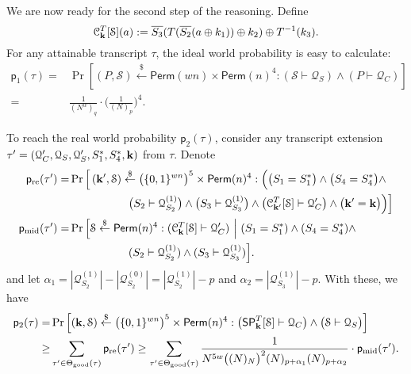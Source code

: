 \documentclass[journal=tosc,final,nohyperref]{iacrtrans}
\begin{document}
We are now ready for the second step of the reasoning. Define
%
$$\mathcal{C}_{\mathbf{k}}^T[\mathcal{S}](a):=   \overline{S_3}(T(\overline{S_2}(a\oplus k_1))\oplus k_2)\oplus T^{-1}(k_3).$$
%
For any attainable transcript $\tau$, the ideal world probability is easy to calculate:
%
%
\begin{align*}
\mathsf{p}_{1}(\tau)=&\operatorname{Pr}\left[(P,\mathcal{S})\stackrel{\$}{\leftarrow} {\mathsf{Perm}}(wn)\times\mathsf{Perm}(n)^4: (\mathcal{S} \vdash \mathcal{Q}_{S}) \wedge(P \vdash \mathcal{Q}_{C})  \right]		\\
=&\frac{1}{(N^w)_q}\cdot\bigg(\frac{1}{(N)_p}\bigg)^4.
\end{align*}



To reach the real world probability $\mathsf{p}_2(\tau)$, consider any transcript extension $\tau'=(\mathcal{Q}_{C}',\mathcal{Q}_{S},\mathcal{Q}_{S}',S_1^*,S_4^*,\mathbf{k})$ from $\tau$. Denote
%
%
\begin{align}
\mathsf{p}_{\mathrm{re}}(\tau') = & \operatorname{Pr}\Big[\left(\mathbf{k}',\mathcal{S}\right) \stackrel{\$}{\leftarrow} \big(\{0,1\}^{wn}\big)^5 \times \mathsf{Perm}(n)^4:
\Big(\big(S_1=S_1^*\big)\wedge\big(S_4=S_4^*\big)\wedge		\notag 	\\
&\ \ \ \ \ \ \ \ \ \ \ \ \ \ \ \ \big(S_2\vdash\mathcal{Q}_{S_2}^{(1)}\big)\wedge\big(S_3\vdash\mathcal{Q}_{S_3}^{(1)}\big)\wedge\big(\mathcal{C}_{\mathbf{k}'}^T[\mathcal{S}] \vdash \mathcal{Q}_C'\big)\wedge\big(\mathbf{k}'=\mathbf{k}\big)\Big)\Big]	 	\notag 	\\
\mathsf{p}_{\mathrm{mid}}(\tau') = & \operatorname{Pr}\Big[\mathcal{S} \stackrel{\$}{\leftarrow}\mathsf{Perm}(n)^4:(\mathcal{C}_{\mathbf{k}}^T[\mathcal{S}] \vdash \mathcal{Q}_C')~\Big|~
(S_1=S_1^*)\wedge (S_4=S_4^*)\wedge	 	\notag 	\\
&\ \ \ \ \ \ \ \ \ \ \ \ \ \ \ \  (S_2\vdash\mathcal{Q}_{S_2}^{(1)})\wedge (S_3\vdash\mathcal{Q}_{S_3}^{(1)})\Big].	 	\notag 	
\end{align}
%
%
%
and let $\alpha_1=|\mathcal{Q}_{S_2}^{(1)}|-|\mathcal{Q}_{S_2}^{(0)}|=|\mathcal{Q}_{S_2}^{(1)}|-p$ and $\alpha_2=|\mathcal{Q}_{S_3}^{(1)}|-p$. With these, we have
%
%
\begin{align*}
\mathsf{p}_2(\tau)=&\operatorname{Pr}\left[\left(\mathbf{k},\mathcal{S}\right) \stackrel{\$}{\leftarrow} \big(\{0,1\}^{wn}\big)^5 \times \mathsf{Perm}(n)^4:\big(\spn_{\bfk}^{T}[\mathcal{S}] \vdash \mathcal{Q}_{C}\big) \wedge \big(\mathcal{S} \vdash \mathcal{Q}_{S}\big)\right]		\\
\geq & \sum_{\tau^{\prime} \in \Theta_{\mathrm{good}}(\tau)} \mathsf{p}_{\mathrm{re}}(\tau')  
\geq
\sum_{\tau^{\prime} \in \Theta_{\mathrm{good}}(\tau)}
%
\frac{1}{N^{5w}\big((N)_{N}\big)^2(N)_{p+\alpha_1}(N)_{p+\alpha_2}}\cdot \mathsf{p}_{\mathrm{mid}}(\tau')  .
\end{align*}
\end{document}
